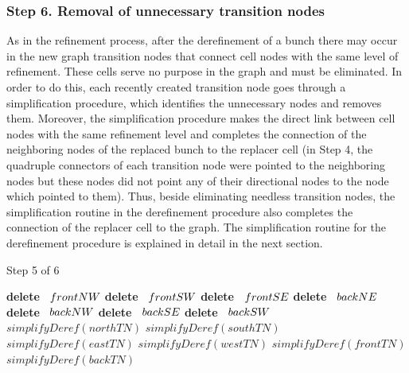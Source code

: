 \subsubsection*{Step 6. Removal of unnecessary transition nodes}
As in the refinement process, after the derefinement of a bunch
there may occur in the new graph transition nodes that connect cell
nodes with the same level of refinement. These cells serve no
purpose in the graph and must be eliminated. In order to do this,
each recently created transition node goes through a simplification
procedure, which identifies the unnecessary nodes and removes them.
Moreover, the simplification procedure makes the direct link between
cell nodes with the same refinement level and completes the
connection of the neighboring nodes of the replaced bunch to the
replacer cell (in Step 4, the quadruple connectors of each
transition node were pointed to the neighboring nodes but these
nodes did not point any of their directional nodes to the node which
pointed to them). Thus, beside eliminating needless transition
nodes, the simplification routine in the derefinement procedure also
completes the connection of the replacer cell to the graph. The
simplification routine for the derefinement procedure is explained
in detail in the next section.

\begin{algorithm}[ht]
    \caption{Step 5 of 6}
    \small{
    \begin{algorithmic}[1]
        \State \textbf{delete} $\hspace{2mm} frontNW $
        \State \textbf{delete} $\hspace{2mm} frontSW $
        \State \textbf{delete} $\hspace{2mm} frontSE $
        \State \textbf{delete} $\hspace{2mm} backNE $
        \State \textbf{delete} $\hspace{2mm} backNW $
        \State \textbf{delete} $\hspace{2mm} backSE $
        \State \textbf{delete} $\hspace{2mm} backSW $
        \State
        \State $simplifyDeref(northTN)$
        \State $simplifyDeref(southTN) $
        \State $simplifyDeref(eastTN) $
        \State $simplifyDeref(westTN) $
        \State $simplifyDeref(frontTN) $
        \State $simplifyDeref(backTN) $
        \EndProcedure
    \end{algorithmic}
    }
    \label{STEP_5_AND_6_DEREFINEMENT}
\end{algorithm}

